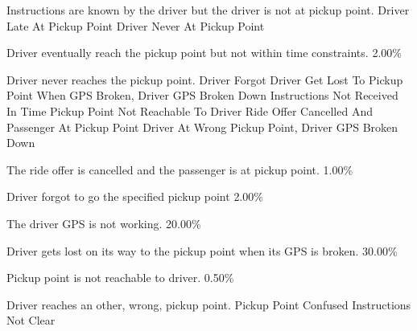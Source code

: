   \startkaosspec
  	 {Instructions are known by the driver but the driver is not at pickup point.}
  	 {Driver Late At Pickup Point}
  	 {Driver Never At Pickup Point}
  \stopkaosspec
  
  \startkaosspec
  	 {Driver eventually reach the pickup point but not within time constraints.}
  	 {2.00\%}
  \stopkaosspec
  
  \startkaosspec
  	 {Driver never reaches the pickup point.}
  	 {Driver Forgot}
  	 {Driver Get Lost To Pickup Point When GPS Broken, Driver GPS Broken Down}
  	 {Instructions Not Received In Time}
  	 {Pickup Point Not Reachable To Driver}
  	 {Ride Offer Cancelled And Passenger At Pickup Point}
  	 {Driver At Wrong Pickup Point, Driver GPS Broken Down}
  \stopkaosspec
  
  \startkaosspec
  	 {The ride offer is cancelled and the passenger is at pickup point.}
  	 {1.00\%}
  \stopkaosspec
  
  \startkaosspec
  	 {Driver forgot to go the specified pickup point}
  	 {2.00\%}
  \stopkaosspec
  
  \startkaosspec
  	 {The driver GPS is not working.}
  	 {20.00\%}
  \stopkaosspec
  
  \startkaosspec
  	 {Driver gets lost on its way to the pickup point when its GPS is broken.}
  	 {30.00\%}
  \stopkaosspec
  
  \startkaosspec
  	 {Pickup point is not reachable to driver.}
  	 {0.50\%}
  \stopkaosspec
  
  \startkaosspec
  	 {Driver reaches an other, wrong, pickup point.}
  	 {Pickup Point Confused}
  	 {Instructions Not Clear}
  \stopkaosspec
  
